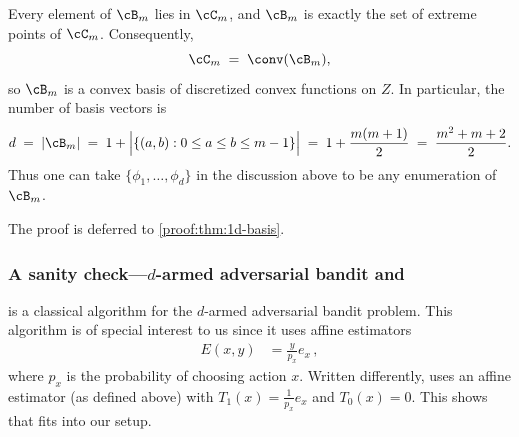 \begin{theorem}\label{thm:1d-basis}
    Every element of $\cB_m$ lies in $\cC_m$, and $\cB_m$ is exactly the set of
    extreme points of $\cC_m$.
    Consequently,
    \[
        \cC_m \;=\; \conv(\cB_m),
    \]
    so $\cB_m$ is a convex basis of discretized convex functions on $Z$.
    In particular, the number of basis vectors is
    \[
        d \;=\; |\cB_m|
        \;=\;
        1 + \Bigl|\{(a,b):0\le a\le b\le m-1\}\Bigr|
        \;=\;
        1 + \frac{m(m+1)}{2}
        \;=\;
        \frac{m^2+m+2}{2}.
    \]
    Thus one can take $\{\phi_1,\dots,\phi_d\}$ in the discussion above to be any
    enumeration of $\cB_m$.
\end{theorem}
\noindent The proof is deferred to \ref{proof:thm:1d-basis}.




\subsubsection{A sanity check---$d$-armed adversarial bandit and \expthree}
\expthree is a classical algorithm for the $d$-armed adversarial bandit problem.
This algorithm is of special interest to us since it uses affine estimators
\begin{align*}
    E(x,y) & = \frac{y}{p_x} e_x\,,
\end{align*}
where $p_x$ is the probability of choosing action $x$.
Written differently, \expthree uses an affine estimator (as defined above)
with $T_1(x) = \frac{1}{p_x} e_x$ and $T_0(x) = 0$.
This shows that \expthree fits into our setup.

